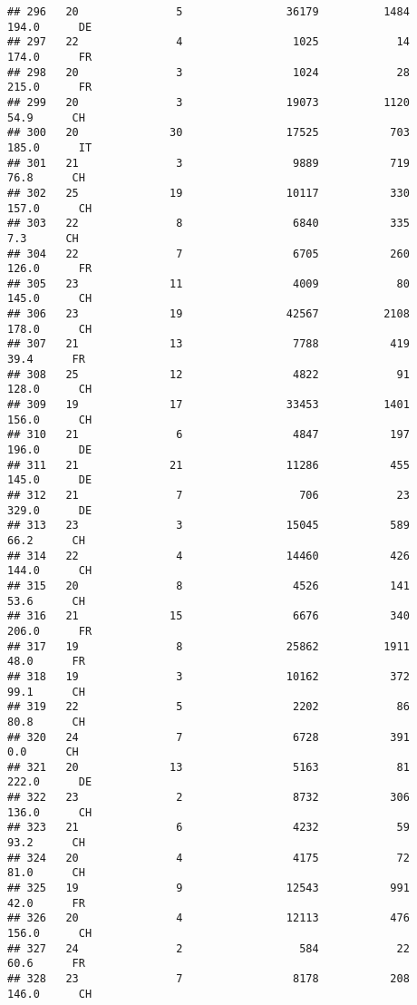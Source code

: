\documentclass[
]{article}
\begin{document}
\begin{verbatim}
## 296   20               5                36179          1484    194.0      DE
## 297   22               4                 1025            14    174.0      FR
## 298   20               3                 1024            28    215.0      FR
## 299   20               3                19073          1120     54.9      CH
## 300   20              30                17525           703    185.0      IT
## 301   21               3                 9889           719     76.8      CH
## 302   25              19                10117           330    157.0      CH
## 303   22               8                 6840           335      7.3      CH
## 304   22               7                 6705           260    126.0      FR
## 305   23              11                 4009            80    145.0      CH
## 306   23              19                42567          2108    178.0      CH
## 307   21              13                 7788           419     39.4      FR
## 308   25              12                 4822            91    128.0      CH
## 309   19              17                33453          1401    156.0      CH
## 310   21               6                 4847           197    196.0      DE
## 311   21              21                11286           455    145.0      DE
## 312   21               7                  706            23    329.0      DE
## 313   23               3                15045           589     66.2      CH
## 314   22               4                14460           426    144.0      CH
## 315   20               8                 4526           141     53.6      CH
## 316   21              15                 6676           340    206.0      FR
## 317   19               8                25862          1911     48.0      FR
## 318   19               3                10162           372     99.1      CH
## 319   22               5                 2202            86     80.8      CH
## 320   24               7                 6728           391      0.0      CH
## 321   20              13                 5163            81    222.0      DE
## 322   23               2                 8732           306    136.0      CH
## 323   21               6                 4232            59     93.2      CH
## 324   20               4                 4175            72     81.0      CH
## 325   19               9                12543           991     42.0      FR
## 326   20               4                12113           476    156.0      CH
## 327   24               2                  584            22     60.6      FR
## 328   23               7                 8178           208    146.0      CH

\end{verbatim}
\end{document}

